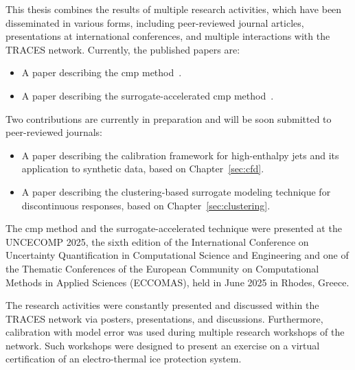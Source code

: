 This thesis combines the results of multiple research activities, which have been disseminated in various forms, including peer-reviewed journal articles, presentations at international conferences, and multiple interactions with the TRACES network. Currently, the published papers are:

\begin{itemize}
    \item A paper describing the \gls{cmp} method~\cite{cmp}.
    \item A paper describing the surrogate-accelerated \gls{cmp} method~\cite{surr}.
\end{itemize}

Two contributions are currently in preparation and will be soon submitted to peer-reviewed journals:

\begin{itemize}
    \item A paper describing the calibration framework for high-enthalpy jets and its application to synthetic data, based on Chapter~\ref{sec:cfd}.
    \item A paper describing the clustering-based surrogate modeling technique for discontinuous responses, based on Chapter~\ref{sec:clustering}.
\end{itemize}

The \gls{cmp} method and the surrogate-accelerated technique were presented at the UNCECOMP 2025, the sixth edition of the International Conference on Uncertainty Quantification in Computational Science and Engineering and one of the Thematic Conferences of the European Community on Computational Methods in Applied Sciences (ECCOMAS), held in June 2025 in Rhodes, Greece.

\smallskip
The research activities were constantly presented and discussed within the TRACES network via posters, presentations, and discussions. Furthermore, calibration with model error was used during multiple research workshops of the network. Such workshops were designed to present an exercise on a virtual certification of an electro-thermal ice protection system.